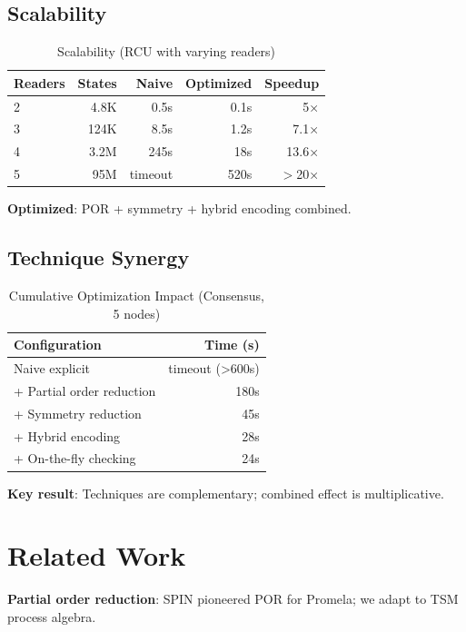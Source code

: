 \documentclass[conference]{IEEEtran}
\begin{document}
\subsection{Scalability}

\begin{table}[h]
\centering
\caption{Scalability (RCU with varying readers)}
\label{tab:scalability}
\begin{tabular}{lrrrr}
\toprule
\textbf{Readers} & \textbf{States} & \textbf{Naive} & \textbf{Optimized} & \textbf{Speedup} \\
\midrule
2 & 4.8K & 0.5s & 0.1s & 5× \\
3 & 124K & 8.5s & 1.2s & 7.1× \\
4 & 3.2M & 245s & 18s & 13.6× \\
5 & 95M & timeout & 520s & $>$20× \\
\bottomrule
\end{tabular}
\end{table}

\textbf{Optimized}: POR + symmetry + hybrid encoding combined.

\subsection{Technique Synergy}

\begin{table}[h]
\centering
\caption{Cumulative Optimization Impact (Consensus, 5 nodes)}
\label{tab:synergy}
\begin{tabular}{lr}
\toprule
\textbf{Configuration} & \textbf{Time (s)} \\
\midrule
Naive explicit & timeout (>600s) \\
+ Partial order reduction & 180s \\
+ Symmetry reduction & 45s \\
+ Hybrid encoding & 28s \\
+ On-the-fly checking & 24s \\
\bottomrule
\end{tabular}
\end{table}

\textbf{Key result}: Techniques are complementary; combined effect is multiplicative.

\section{Related Work}

\textbf{Partial order reduction}: SPIN \cite{holzmann1997} pioneered POR for Promela; we adapt to TSM process algebra.
\end{document}
